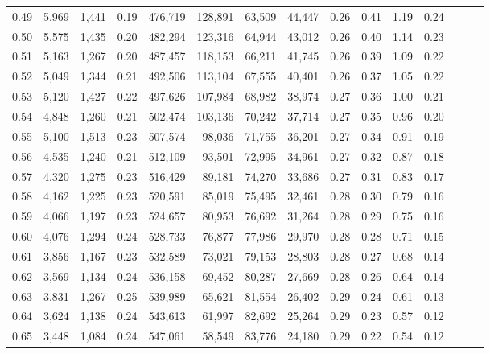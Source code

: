 \begin{tabular}{rrrrrrrrrrrrrrr}
0.49 &   5,969 &  1,441 &  0.19 &  476,719 &  128,891 &   63,509 &   44,447 &  0.26 &  0.41 &  1.19 &      0.24 \\
0.50 &   5,575 &  1,435 &  0.20 &  482,294 &  123,316 &   64,944 &   43,012 &  0.26 &  0.40 &  1.14 &      0.23 \\
0.51 &   5,163 &  1,267 &  0.20 &  487,457 &  118,153 &   66,211 &   41,745 &  0.26 &  0.39 &  1.09 &      0.22 \\
0.52 &   5,049 &  1,344 &  0.21 &  492,506 &  113,104 &   67,555 &   40,401 &  0.26 &  0.37 &  1.05 &      0.22 \\
0.53 &   5,120 &  1,427 &  0.22 &  497,626 &  107,984 &   68,982 &   38,974 &  0.27 &  0.36 &  1.00 &      0.21 \\
0.54 &   4,848 &  1,260 &  0.21 &  502,474 &  103,136 &   70,242 &   37,714 &  0.27 &  0.35 &  0.96 &      0.20 \\
0.55 &   5,100 &  1,513 &  0.23 &  507,574 &   98,036 &   71,755 &   36,201 &  0.27 &  0.34 &  0.91 &      0.19 \\
0.56 &   4,535 &  1,240 &  0.21 &  512,109 &   93,501 &   72,995 &   34,961 &  0.27 &  0.32 &  0.87 &      0.18 \\
0.57 &   4,320 &  1,275 &  0.23 &  516,429 &   89,181 &   74,270 &   33,686 &  0.27 &  0.31 &  0.83 &      0.17 \\
0.58 &   4,162 &  1,225 &  0.23 &  520,591 &   85,019 &   75,495 &   32,461 &  0.28 &  0.30 &  0.79 &      0.16 \\
0.59 &   4,066 &  1,197 &  0.23 &  524,657 &   80,953 &   76,692 &   31,264 &  0.28 &  0.29 &  0.75 &      0.16 \\
0.60 &   4,076 &  1,294 &  0.24 &  528,733 &   76,877 &   77,986 &   29,970 &  0.28 &  0.28 &  0.71 &      0.15 \\
0.61 &   3,856 &  1,167 &  0.23 &  532,589 &   73,021 &   79,153 &   28,803 &  0.28 &  0.27 &  0.68 &      0.14 \\
0.62 &   3,569 &  1,134 &  0.24 &  536,158 &   69,452 &   80,287 &   27,669 &  0.28 &  0.26 &  0.64 &      0.14 \\
0.63 &   3,831 &  1,267 &  0.25 &  539,989 &   65,621 &   81,554 &   26,402 &  0.29 &  0.24 &  0.61 &      0.13 \\
0.64 &   3,624 &  1,138 &  0.24 &  543,613 &   61,997 &   82,692 &   25,264 &  0.29 &  0.23 &  0.57 &      0.12 \\
0.65 &   3,448 &  1,084 &  0.24 &  547,061 &   58,549 &   83,776 &   24,180 &  0.29 &  0.22 &  0.54 &      0.12 \\

\end{tabular}
